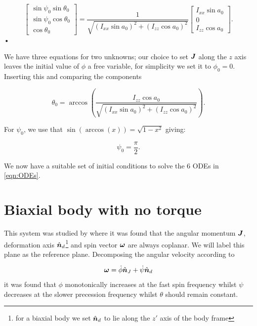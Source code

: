 \documentclass[11pt]{article}
\numberwithin{equation}{section}
\numberwithin{figure}{section}
\numberwithin{table}{section}
\begin{document}
\begin{equation}
\left[ \begin{array}{c}
\sin \psi_{0} \sin \theta_{0} \\
\sin \psi_{0} \cos \theta_{0} \\
\cos \theta_{0}
\end{array}\right]
 = \frac{1}{\sqrt{(I_{xx}\sin a_{0})^{2}  + (I_{zz}\cos a_{0})^{2}}} 
\left[ \begin{array}{c}
I_{xx}\sin a_{0} \\
0 \\
I_{zz} \cos a_{0}
\end{array}\right].
\end{equation}•

We have three equations for two unknowns; our choice to set $\boldsymbol{J}$ along
the $z$ axis leaves the initial value of $\phi$ a free variable, for simplicity
we set it to $\phi_{0} = 0$. Inserting this and comparing the components

\begin{equation}
\theta_{0} =  \arccos\left(\frac{I_{zz}\cos a_{0}}{ \sqrt{(I_{xx}\sin a_{0})^{2}  + (I_{zz}\cos a_{0})^{2}}} \right).
\label{eqn:theta init}
\end{equation} 

For $\psi_0$, we  use that $\sin(\arccos(x)) = \sqrt{1 - x^{2}}$ giving:

\begin{equation}
\psi_0 = \frac{\pi}{2}.
\end{equation}

We now have a suitable set of initial conditions to solve the 6 ODEs in \eqref{eqn:ODEs}.

\section{Biaxial body with no torque}

This system was studied by \citet{Jones2001} where it was  found that the
angular momentum $\boldsymbol{J}$, deformation axis $\hat{\boldsymbol{n}}_{d}$\footnote{for a biaxial body we
    set $\hat{\boldsymbol{n}}_{d}$ to lie along the $z'$ axis of the body frame} and spin vector
    $\boldsymbol{\omega}$ are always coplanar. We will label this plane as the reference
    plane. Decomposing the angular velocity according to 

\begin{equation}
\boldsymbol{\omega} = \dot{\phi}\hat{\boldsymbol{n}}_{J} + \dot{\psi}\hat{\boldsymbol{n}}_{d}
\label{eqn:decomp}
\end{equation}
it was found that $\phi$ monotonically increases at the  fast spin frequency whilst $\psi$ decreases at the slower precession frequency whilst $\theta$ should remain constant. 
\end{document}
